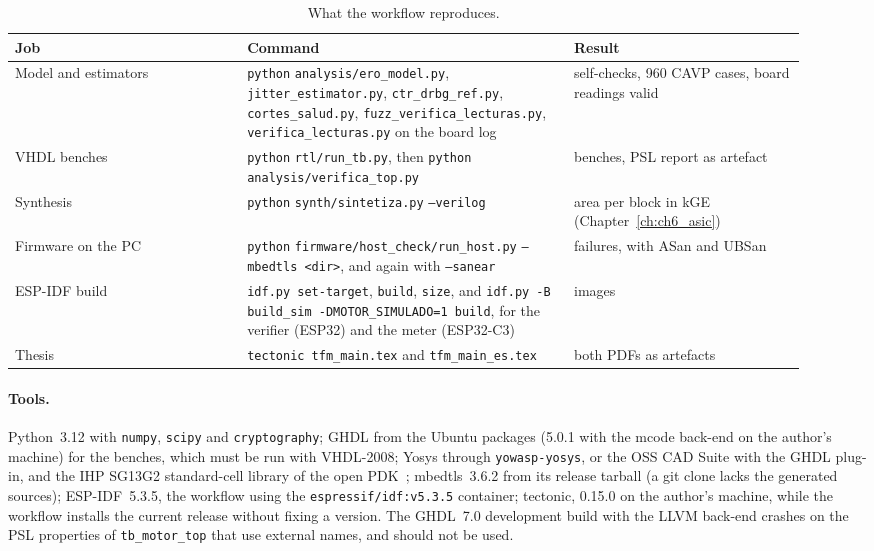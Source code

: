 \begin{table}[htbp]
\centering\small
\caption{What the workflow reproduces.}
\label{tab:app_ci}
\begin{tabular}{@{}>{\raggedright\arraybackslash}p{0.27\linewidth}>{\raggedright\arraybackslash}p{0.38\linewidth}>{\raggedright\arraybackslash}p{0.27\linewidth}@{}}
\toprule
Job & Command & Result \\
\midrule
Model and estimators & \texttt{python} \nolinkurl{analysis/ero_model.py},
  \texttt{jitter\_estimator.py}, \texttt{ctr\_drbg\_ref.py},
  \texttt{cortes\_salud.py}, \texttt{fuzz\_verifica\_lecturas.py},
  \texttt{verifica\_lecturas.py} on the board log & self-checks, 960
  \ac{CAVP} cases, board readings valid \\
\ac{VHDL} benches & \texttt{python} \nolinkurl{rtl/run_tb.py}, then
  \texttt{python} \nolinkurl{analysis/verifica_top.py} & 13 benches, \acs{PSL}
  report as artefact \\
Synthesis & \texttt{python} \nolinkurl{synth/sintetiza.py} \texttt{--verilog} &
  area per block in kGE (Chapter~\ref{ch:ch6_asic}) \\
Firmware on the PC & \texttt{python} \nolinkurl{firmware/host_check/run_host.py}
  \texttt{--mbedtls <dir>}, and again with \texttt{--sanear} & 0 failures, with
  ASan and UBSan \\
ESP-IDF build & \texttt{idf.py set-target}, \texttt{build}, \texttt{size},
  and \texttt{idf.py -B build\_sim -DMOTOR\_SIMULADO=1 build}, for the
  verifier (ESP32) and the meter (ESP32-C3) & 4 images \\
Thesis & \texttt{tectonic tfm\_main.tex} and \texttt{tfm\_main\_es.tex} &
  both PDFs as artefacts \\
\bottomrule
\end{tabular}
\end{table}

\paragraph{Tools.} Python~3.12 with \texttt{numpy}, \texttt{scipy} and
\texttt{cryptography}; GHDL from the Ubuntu packages (5.0.1 with the mcode back-end on the
author's machine) for the benches, which must be run with \acs{VHDL}-2008; Yosys through
\texttt{yowasp-yosys}, or the OSS CAD Suite with the GHDL plug-in, and the
IHP SG13G2 standard-cell library of the open
\ac{PDK}~\cite{ihp_openpdk_repo}; mbedtls~3.6.2 from its release tarball
(a git clone lacks the generated sources); ESP-IDF~5.3.5, the workflow
using the \nolinkurl{espressif/idf:v5.3.5} container; tectonic, 0.15.0
on the author's machine, while the workflow installs the current release
without fixing a version. The
GHDL~7.0 development build with the LLVM back-end crashes on the
\acs{PSL} properties of \texttt{tb\_motor\_top} that use external names,
and should not be used.

